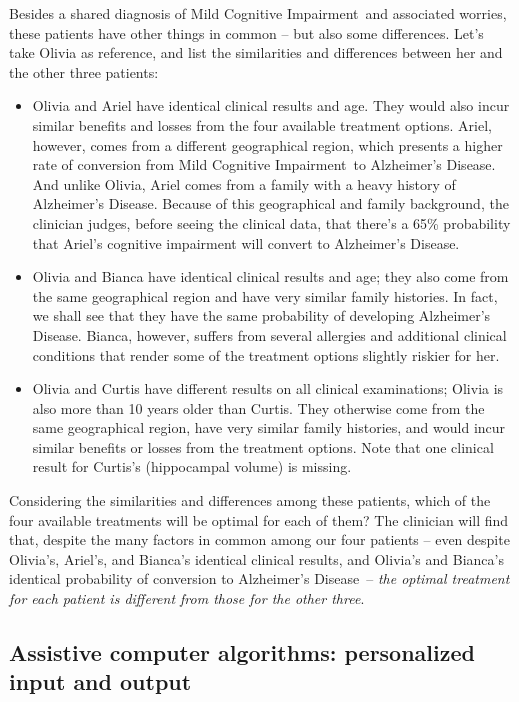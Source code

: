\documentclass[utf8]{FrontiersinHarvard} %
\renewcommand*{\|}[1][]{\nonscript\:#1\vert\nonscript\:\mathopen{}}
\newcommand*{\ad}{Alzheimer's Disease}
\newcommand*{\mci}{Mild Cognitive Impairment}
\begin{document}
Besides a shared diagnosis of \mci\ and associated worries, these patients have other things in common -- but also some differences. Let's take Olivia as reference, and list the similarities and differences between her and the other three patients:
\begin{itemize}
\item Olivia and Ariel have identical clinical results and age. They would also incur similar benefits and losses from the four available treatment options. Ariel, however, comes from a different geographical region, which presents a higher rate of conversion from \mci\ to \ad. And unlike Olivia, Ariel comes from a family with a heavy history of \ad. Because of this geographical and family background, the clinician judges, before seeing the clinical data, that there's a 65\% probability that Ariel's cognitive impairment will convert to \ad.

\item Olivia and Bianca have identical clinical results and age; they also come from the same geographical region and have very similar family histories. In fact, we shall see that they have the same probability of developing \ad. Bianca, however, suffers from several allergies and additional clinical conditions that render some of the treatment options slightly riskier for her.

\item Olivia and Curtis have different results on all clinical examinations; Olivia is also more than 10 years older than Curtis. They otherwise come from the same geographical region, have very similar family histories, and would incur similar benefits or losses from the treatment options. Note that one clinical result for Curtis's (hippocampal volume) is missing.
\end{itemize}

Considering the similarities and differences among these patients, which of the four available treatments will be optimal for each of them? The clinician will find that, despite the many factors in common among our four patients -- even despite Olivia's, Ariel's, and Bianca's identical clinical results, and Olivia's and Bianca's identical probability of conversion to \ad\ -- \emph{the optimal treatment for each patient is different from those for the other three}.

\subsection{Assistive computer algorithms: personalized input and output}
\label{sec:intro_purposes}
\end{document}
